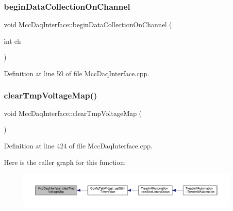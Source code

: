 \subsubsection{\texorpdfstring{begin\+Data\+Collection\+On\+Channel}{beginDataCollectionOnChannel}}
{\footnotesize\ttfamily void Mcc\+Daq\+Interface\+::begin\+Data\+Collection\+On\+Channel (\begin{DoxyParamCaption}\item[{int}]{ch }\end{DoxyParamCaption})\hspace{0.3cm}{\ttfamily [slot]}}



Definition at line 59 of file Mcc\+Daq\+Interface.\+cpp.

\mbox{\label{class_mcc_daq_interface_adbcc5a67d3e2aaef7742883bc58e19a7}} 
\subsubsection{\texorpdfstring{clear\+Tmp\+Voltage\+Map()}{clearTmpVoltageMap()}}
{\footnotesize\ttfamily void Mcc\+Daq\+Interface\+::clear\+Tmp\+Voltage\+Map (\begin{DoxyParamCaption}{ }\end{DoxyParamCaption})}



Definition at line 424 of file Mcc\+Daq\+Interface.\+cpp.

Here is the caller graph for this function\+:
\nopagebreak
\begin{figure}[H]
\begin{center}
\leavevmode
\includegraphics[width=350pt]{class_mcc_daq_interface_adbcc5a67d3e2aaef7742883bc58e19a7_icgraph}
\end{center}
\end{figure}
\mbox{\label{class_mcc_daq_interface_af4fee75cc1637188c98bd7c1ddc745a2}} 
